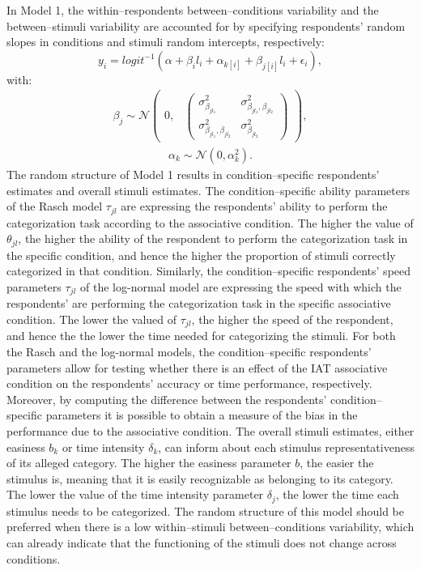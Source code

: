 \documentclass[12pt]{book}
\begin{document}
In Model 1, the within--respondents between--conditions variability and the between--stimuli variability are accounted for by specifying respondents' random slopes in conditions and stimuli random intercepts, respectively:
%
\begin{equation}\label{Accuracy1}
y_{i} = logit^{-1}(\alpha + \beta_il_i + \alpha_{k[i]} +  \beta_{j[i]}l_{i} + \epsilon_{i}),
\end{equation}
with:
\begin{align}
\beta_{j} \sim  \mathcal{N}
\begin{pmatrix}
0,&
\begin{pmatrix}
\sigma_{\beta_{jl_1}}^2 & \sigma_{\beta_ {jl_1}, \beta_{jl_2}}^2 \\
\sigma_{{\beta_{jl_1}}, \beta_{jl_2}}^2& \sigma_{\beta_{jl_2}}^2
\end{pmatrix}
\end{pmatrix},
\end{align}
\begin{align}
	\alpha_k \sim \mathcal{N} (0, \alpha_k^2).
\end{align}
%
The random structure of Model 1 results in condition--specific respondents' estimates and overall stimuli estimates. The condition--specific ability parameters of the Rasch model $\tau_{jl}$ are expressing the respondents' ability to perform the categorization task according to the associative condition. The higher the value of $\theta_{jl}$, the higher the ability of the respondent to perform the categorization task in the specific condition, and hence the higher the proportion of stimuli correctly categorized in that condition. Similarly, the condition--specific respondents' speed parameters $\tau_{jl}$ of the log-normal model are expressing the speed with which the respondents' are performing the categorization task in the specific associative condition. The lower the valued of $\tau_{jl}$, the higher the speed of the respondent, and hence the the lower the time needed for categorizing the stimuli. For both the Rasch and the log-normal models, the condition--specific respondents' parameters allow for testing whether there is an effect of the IAT associative condition on the respondents' accuracy or time performance, respectively.  Moreover, by computing the difference between the respondents' condition--specific parameters it is possible to obtain a measure of the bias in the performance due to the associative condition. The overall stimuli estimates, either easiness $b_{k}$ or time intensity $\delta_k$, can inform about each stimulus representativeness of its alleged category. The higher the easiness parameter $b$, the easier the stimulus is, meaning that it is easily recognizable as belonging to its category. The lower the value of the time intensity parameter $\delta_j$, the lower the time each stimulus needs to be categorized. 
The random structure of this model should be preferred when there is a low within--stimuli between--conditions variability, which can already indicate that the functioning of the stimuli does not change across conditions. 
\end{document}
